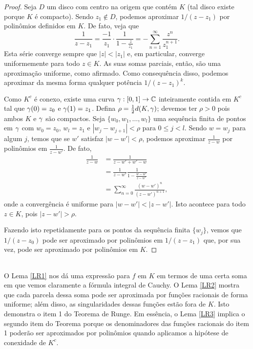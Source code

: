     \begin{proof}
        Seja $D$ um disco com centro na origem que contém $K$ (tal disco existe porque 
        $K$ é compacto). Sendo $z_1 \not \in D$, podemos aproximar $1/(z-z_1)$ por polinômios
        definidos em $K$. De fato, veja que
        \begin{equation*}
        \frac{1}{z-z_1}
        =
        \frac{-1}{z_1}\cdot\frac{1}{1-\frac{z}{z_1}} = - \sum_{n=1}^{\infty}\frac{z^n}{z_1^{n+1}}.
        \end{equation*}
        Esta série converge sempre que $|z| < |z_1|$ e, em particular, converge uniformemente 
        para todo $z \in K$. As suas somas parciais, então, são uma aproximação uniforme, 
        como afirmado. Como consequência disso, podemos aproximar da mesma forma qualquer 
        potência $1/(z-z_1)^k$.
        
        Como $K^c$ é conexo, existe uma curva $\gamma : [0,1] \to \mathbb{C}$ inteiramente contida em 
        $K^c$ tal que $\gamma(0) = z_0$ e $\gamma(1) =  z_1$. Defina $\rho = \frac{1}{2}d(K,\gamma)$;
        devemos ter $\rho > 0$ pois ambos $K$ e $\gamma$ são compactos. 
        Seja $\{w_0, w_1, \dots, w_l\}$ uma sequência finita de pontos em $\gamma$ com $w_0 = z_0$,
        $w_l = z_1$ e $|w_j - w_{j+1}| < \rho$ para $0 \leq j < l$. Sendo $w = w_j$ para algum $j$,
        temos que se $w'$ satisfaz $|w - w'| < \rho$, podemos aproximar $\frac{1}{z-w}$ 
        por polinômios em $\frac{1}{z-w'}$. De fato, 
        \begin{align*}
            \frac{1}{z-w} &= \frac{1}{z - w' + w' - w}\\
                          &= \frac{1}{z-w'}\frac{1}{1 - \frac{w - w'}{z - w'}}\\
                          &= \sum_{n = 0}^{\infty}\frac{(w-w')^n}{(z-w')^{n+1}},
        \end{align*}
        onde a convergência é uniforme para $|w-w'| < |z-w'|$. Isto acontece para todo 
        $z \in K$, pois $|z-w'|> \rho$.
        
        Fazendo isto repetidamente para os pontos da sequência finita $\{w_j\}$, vemos que 
        $1/(z-z_0)$ pode ser aproximado por polinômios em $1/(z-z_1)$ que, por sua vez, pode 
        ser aproximado por polinômios em $K$.
    \end{proof}
    \\
    
    O Lema \ref{LR1} nos dá uma expressão para $f$ em $K$ em termos de uma certa soma em 
    que vemos claramente a fórmula integral de Cauchy. O Lema \ref{LR2} mostra que cada parcela 
    dessa soma pode ser aproximada por funções racionais de forma uniforme; além disso, as
    singularidades dessas funções estão fora de $K$. Isto demonstra o item 1 do Teorema de Runge. 
    Em essência, o Lema \ref{LR3} implica o segundo item do Teorema porque os denominadores das
    funções racionais do item 1 poderão ser aproximados por polinômios quando aplicamos a hipótese
    de conexidade de $K^c$.
    

